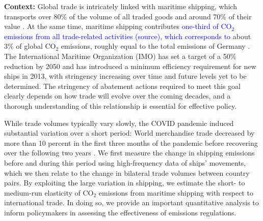 \documentclass[hidelinks, 12pt,letterpaper]{article}
\begin{document}
\noindent \textbf{Context:} 
Global trade is intricately linked with maritime shipping, which transports over 80\% of the volume of all traded goods and around 70\% of their value \citep{unctad2017review}.
At the same time, maritime shipping contributes \textcolor{blue}{one-third of CO$_2$ emissions from all trade-related activities (source), which corresponds to}
about 3\% of global CO$_2$ emissions, roughly equal to the total emissions of Germany \citep{faber2020fourth}. The International Maritime Organization (IMO) has set a target of a 50\% reduction by 2050 and has introduced a minimum efficiency requirement for new ships in 2013, with stringency increasing over time and future levels yet to be determined.    %
The stringency of abatement actions required to meet this goal clearly depends on how trade will evolve over the coming decades, and a thorough understanding of this relationship is essential for effective policy.  %



While trade volumes typically vary slowly, the COVID pandemic induced substantial variation over a short period:
World merchandise trade decreased by more than 10 percent in the first three months of the pandemic before recovering over the following two years \citep{oecd21}. %
We first measure the change in shipping emissions before and during this period using high-frequency data of ships' movements, which we then relate to the change in bilateral trade volumes between country pairs. By exploiting the large variation in shipping, we estimate the short- to medium-run elasticity of CO$_2$ emissions from maritime shipping with respect to international trade. In doing so, we provide an
important quantitative analysis to inform policymakers in assessing the effectiveness of emissions regulations.  %
\end{document}
